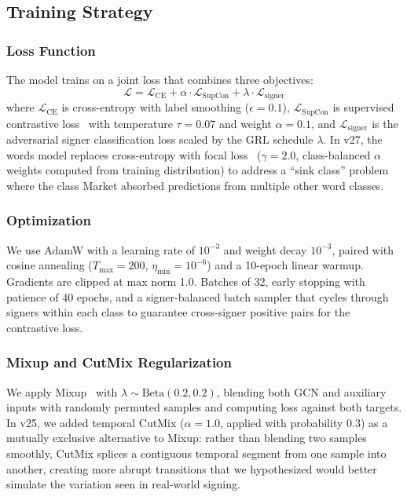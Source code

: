 \documentclass[conference]{IEEEtran}
\begin{document}
\subsection{Training Strategy}

\subsubsection{Loss Function}
The model trains on a joint loss that combines three objectives:
\begin{equation}
    \mathcal{L} = \mathcal{L}_{\text{CE}} + \alpha \cdot \mathcal{L}_{\text{SupCon}} + \lambda \cdot \mathcal{L}_{\text{signer}}
\end{equation}
where $\mathcal{L}_{\text{CE}}$ is cross-entropy with label smoothing ($\epsilon = 0.1$), $\mathcal{L}_{\text{SupCon}}$ is supervised contrastive loss~\cite{khosla2020supcon} with temperature $\tau = 0.07$ and weight $\alpha = 0.1$, and $\mathcal{L}_{\text{signer}}$ is the adversarial signer classification loss scaled by the GRL schedule $\lambda$. In v27, the words model replaces cross-entropy with focal loss~\cite{lin2017focal} ($\gamma = 2.0$, class-balanced $\alpha$ weights computed from training distribution) to address a ``sink class'' problem where the class Market absorbed predictions from multiple other word classes.

\subsubsection{Optimization}
We use AdamW with a learning rate of $10^{-3}$ and weight decay $10^{-3}$, paired with cosine annealing ($T_{\max} = 200$, $\eta_{\min} = 10^{-6}$) and a 10-epoch linear warmup. Gradients are clipped at max norm 1.0. Batches of 32, early stopping with patience of 40 epochs, and a signer-balanced batch sampler that cycles through signers within each class to guarantee cross-signer positive pairs for the contrastive loss.

\subsubsection{Mixup and CutMix Regularization}
We apply Mixup~\cite{zhang2018mixup} with $\lambda \sim \text{Beta}(0.2, 0.2)$, blending both GCN and auxiliary inputs with randomly permuted samples and computing loss against both targets. In v25, we added temporal CutMix ($\alpha = 1.0$, applied with probability 0.3) as a mutually exclusive alternative to Mixup: rather than blending two samples smoothly, CutMix splices a contiguous temporal segment from one sample into another, creating more abrupt transitions that we hypothesized would better simulate the variation seen in real-world signing.
\end{document}
